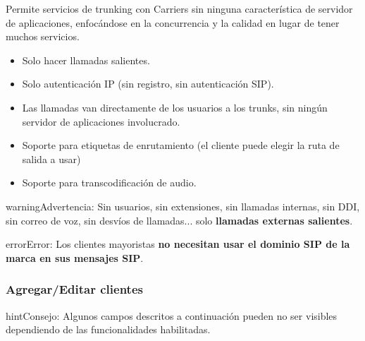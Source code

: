 \documentclass[letterpaper,10pt,spanish]{sphinxmanual}
\begin{document}
Permite servicios de trunking con Carriers sin ninguna característica de servidor de aplicaciones, enfocándose en la concurrencia y la calidad en lugar de tener muchos servicios.
\begin{itemize}
\item {} 
Solo hacer llamadas salientes.

\item {} 
Solo autenticación IP (sin registro, sin autenticación SIP).

\item {} 
Las llamadas van directamente de los usuarios a los trunks, sin ningún servidor de aplicaciones involucrado.

\item {} 
Soporte para etiquetas de enrutamiento (el cliente puede elegir la ruta de salida a usar)

\item {} 
Soporte para transcodificación de audio.

\end{itemize}

\begin{notice}{warning}{Advertencia:}
Sin usuarios, sin extensiones, sin llamadas internas, sin DDI, sin correo de voz, sin desvíos de llamadas... solo \textbf{llamadas externas salientes}.
\end{notice}

\begin{notice}{error}{Error:}
Los clientes mayoristas \textbf{no necesitan usar el dominio SIP de la marca en sus mensajes SIP}.
\end{notice}


\subsubsection{Agregar/Editar clientes}
\label{administration_portal/brand/clients/wholesale:adding-editing-clients}
\begin{notice}{hint}{Consejo:}
Algunos campos descritos a continuación pueden no ser visibles dependiendo de las funcionalidades habilitadas.
\end{notice}
\end{document}
